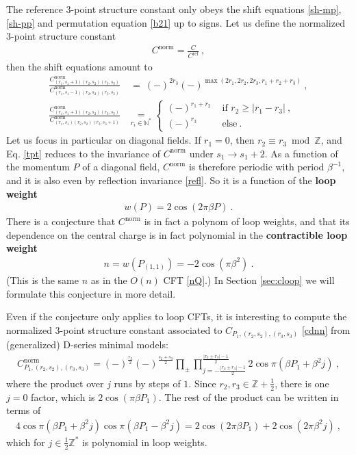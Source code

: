 \documentclass[12pt, a4paper]{article}
\theoremstyle{break}
\begin{document}
The reference 3-point structure constant only obeys the shift equations \eqref{sh-mp}, \eqref{sh-pp} and permutation equation \eqref{b21} up to signs. Let us define the normalized 3-point structure constant 
\begin{align}
 C^\text{norm} = \frac{C}{C^\text{ref}}\ , 
\end{align}
then the shift equations amount to \cite{nrj23}
\begin{align}
 \frac{C^\text{norm}_{(r_1,s_1+1)(r_2,s_2)(r_3,s_3)}}{C^\text{norm}_{(r_1,s_1-1)(r_2,s_2)(r_3,s_3)}} &\ =\  (-)^{2r_3}(-)^{\max(2r_1, 2r_2, 2r_3,r_1+r_2+r_3)} \ ,
 \label{tpt}
 \\
 \frac{C^\text{norm}_{(r_1,s_1+1)(r_2,s_2)(r_3,s_3)}}{C^\text{norm}_{(r_1,s_1)(r_2,s_2)(r_3,s_3+1)}} &\underset{r_i\in\mathbb{N}^*}{=} 
 \left\{\begin{array}{ll} (-)^{r_1+r_2} &\text{ if } r_2\geq |r_1-r_3|\ ,
                        \\ (-)^{r_3} &\text{ else}\ .
                       \end{array}\right. 
\label{tppt}
\end{align}
Let us focus in particular on diagonal fields. If $r_1=0$, then $r_2\equiv r_3\bmod\mathbb{Z}$, and Eq. \eqref{tpt} reduces to the invariance of $C^\text{norm}$ under $s_1\to s_1+2$. As a function of the momentum $P$ of a diagonal field, $C^\text{norm}$ is therefore periodic with period $\beta^{-1}$, and it is also even by reflection invariance \eqref{refl}. So it is a function of the \textbf{loop weight}
\begin{align}
 \boxed{w(P) = 2\cos(2\pi\beta P)}\ .
 \label{wP}
\end{align}
There is a conjecture that $C^\text{norm}$ is in fact a polynom of loop weights, and that its dependence on the central charge is in fact polynomial in the \textbf{contractible loop weight}
\begin{align}
 \boxed{n= w\left(P_{(1,1)}\right) = -2\cos(\pi \beta^2)} \ .
 \label{ncb}
\end{align}
(This is the same $n$ as in the $O(n)$ CFT \eqref{nQ}.) In Section \ref{sec:cloop} we will formulate this conjecture in more detail. 

Even if the conjecture only applies to loop CFTs, it is interesting to compute the normalized 3-point structure constant associated to $C_{P_1,(r_2,s_2),(r_3,s_3)}$ \eqref{cdnn} from (generalized) D-series minimal models:
\begin{align}
 C^\text{norm}_{P_1,(r_2,s_2),(r_3,s_3)} = (-)^{\frac{r_3}{2}}(-)^{\frac{s_2+s_3}{2}} \prod_\pm \prod_{j=-\frac{|r_2\pm r_3|-1}{2}}^{\frac{|r_2\pm r_3|-1}{2}} 2\cos \pi(\beta P_1+\beta^2j) \ ,
\end{align}
where the product over $j$ runs by steps of $1$. Since $r_2,r_3\in\mathbb{Z}+\frac12$, there is one $j=0$ factor, which is $2\cos(\pi \beta P_1)$. The rest of the product can be written in terms of 
\begin{align}
 4\cos \pi(\beta P_1+\beta^2j)\cos \pi(\beta P_1-\beta^2j) = 2\cos(2\pi\beta P_1)+2\cos(2\pi \beta^2j)\ , 
\end{align}
which for $j\in\frac12\mathbb{Z}^*$ is polynomial in loop weights. 
\end{document}
